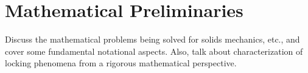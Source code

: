 \chapter{Mathematical Preliminaries}
%
Discuss the mathematical problems being solved for solids mechanics, etc., and cover some fundamental notational aspects. Also, talk about characterization of locking phenomena from a rigorous mathematical perspective.
